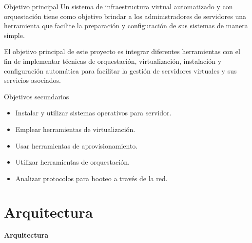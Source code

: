 \begin{frame}{Objetivo principal}
    \vspace{-1.5cm}
    Un sistema de infraestructura virtual automatizado y con orquestación tiene como objetivo brindar a los administradores de servidores una herramienta que facilite la preparación y configuración de sus sistemas de manera simple.

    \begin{block}{}
        El objetivo principal de este proyecto es integrar diferentes herramientas con el fin de implementar técnicas de orquestación, virtualización, instalación y configuración automática para facilitar la gestión de servidores virtuales y sus servicios asociados.
    \end{block}

\end{frame}


\begin{frame}{Objetivos secundarios}
\vspace{-1.5cm}
\begin{itemize}
    \item Instalar y utilizar sistemas operativos para servidor.
    \item Emplear herramientas de virtualización.
    \item Usar herramientas de aprovisionamiento.
    \item Utilizar herramientas de orquestación.
    \item Analizar protocolos para booteo a través de la red.
\end{itemize}

\end{frame}


\section{Arquitectura}

\begin{frame}
    \Huge
    \centering
    \textbf{ Arquitectura }

\end{frame}


